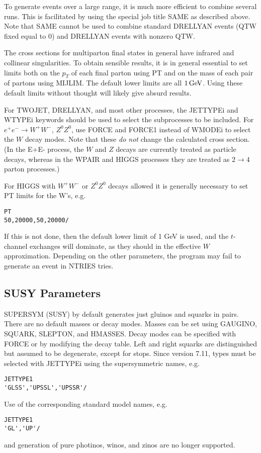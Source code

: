       To generate events over a large range, it is much more efficient
to combine several runs. This is facilitated by using the special job
title SAME as described above. Note that SAME cannot be used to combine
standard DRELLYAN events (QTW fixed equal to 0) and DRELLYAN events with
nonzero QTW.

      The cross sections for multiparton final states in general have
infrared and collinear singularities. To obtain sensible results, it
is in general essential to set limits both on the $p_T$ of each final
parton using PT and on the mass of each pair of partons using MIJLIM.
The default lower limits are all $1\,{\rm GeV}$. Using these default
limits without thought will likely give absurd results.

      For TWOJET, DRELLYAN, and most other processes, the JETTYPEi and
WTYPEi keywords should be used to select the subprocesses to be
included. For $e^+ e^- \to W^+ W^-$, $Z^0 Z^0$, use FORCE and FORCE1
instead of WMODEi to select the $W$ decay modes. Note that these {\it
do not} change the calculated cross section. (In the E+E- process, the
$W$ and $Z$ decays are currently treated as particle decays, whereas in
the WPAIR and HIGGS processes they are treated as $2 \to 4$ parton
processes.)

      For HIGGS with $W^+W^-$ or $Z^0Z^0$ decays allowed it is
generally necessary to set PT limits for the W's, e.g.
\begin{verbatim}
PT
50,20000,50,20000/
\end{verbatim} 
If this is not done, then the default lower limit of 1 GeV is used,
and the $t$-channel exchanges will dominate, as they should in the
effective $W$ approximation. Depending on the other parameters, the
program may fail to generate an event in NTRIES tries.

\subsection{SUSY Parameters}

      SUPERSYM (SUSY) by default generates just gluinos and squarks in
pairs. There are no default masses or decay modes. Masses can be set
using GAUGINO, SQUARK, SLEPTON, and HMASSES. Decay modes can be
specified with FORCE or by modifying the decay table. Left and right
squarks are distinguished but assumed to be degenerate, except for
stops. Since version 7.11, types must be selected with JETTYPEi using
the supersymmetric names, e.g.
\begin{verbatim}
JETTYPE1
'GLSS','UPSSL','UPSSR'/
\end{verbatim}
Use of the corresponding standard model names, e.g.
\begin{verbatim}
JETTYPE1
'GL','UP'/
\end{verbatim}
and generation of pure photinos, winos, and zinos are no longer
supported.

